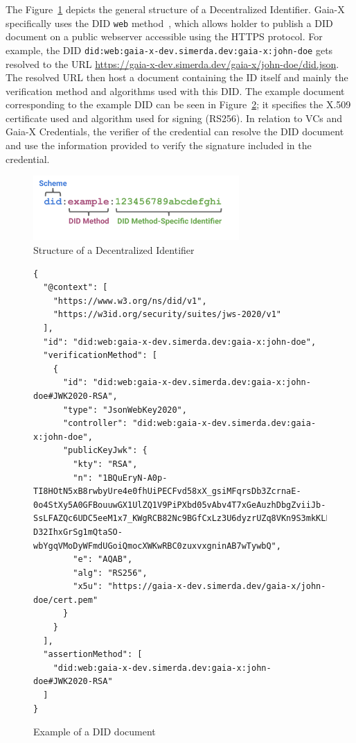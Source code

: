The Figure~\ref{fig:did_structure} depicts the general structure of a Decentralized Identifier.
Gaia-X specifically uses the DID \texttt{web} method~\cite{didweb}, which allows holder to publish a DID document on a public webserver accessible using the HTTPS protocol.
For example, the DID \texttt{did:web:gaia-x-dev.simerda.dev:gaia-x:john-doe} gets resolved to the URL \url{https://gaia-x-dev.simerda.dev/gaia-x/john-doe/did.json}.
The resolved URL then host a document containing the ID itself and mainly the verification method and algorithms used with this DID.
The example document corresponding to the example DID can be seen in Figure~\ref{fig:did_document}; it specifies the X.509 certificate used and algorithm used for signing (RS256).
In relation to VCs and Gaia-X Credentials, the verifier of the credential can resolve the DID document and use the information provided to verify the signature included in the credential.

\begin{figure}
    \centering
    \includegraphics[width=0.7\textwidth]{figures/parts-of-a-did.png}
    \caption{Structure of a Decentralized Identifier~\cite{did}}\label{fig:did_structure}
\end{figure}

\begin{figure}
\centering
\begin{verbatim}
{
  "@context": [
    "https://www.w3.org/ns/did/v1",
    "https://w3id.org/security/suites/jws-2020/v1"
  ],
  "id": "did:web:gaia-x-dev.simerda.dev:gaia-x:john-doe",
  "verificationMethod": [
    {
      "id": "did:web:gaia-x-dev.simerda.dev:gaia-x:john-doe#JWK2020-RSA",
      "type": "JsonWebKey2020",
      "controller": "did:web:gaia-x-dev.simerda.dev:gaia-x:john-doe",
      "publicKeyJwk": {
        "kty": "RSA",
        "n": "1BQuEryN-A0p-TI8HOtN5xB8rwbyUre4e0fhUiPECFvd58xX_gsiMFqrsDb3ZcrnaE-0o4StXy5A0GFBouuwGX1UlZQ1V9PiPXbd05vAbv4T7xGeAuzhDbgZviiJb-SsLFAZQc6UDC5eeM1x7_KWgRCB82Nc9BGfCxLz3U6dyzrUZq8VKn9S3mkKLLuslewa00X8TCHEAVQFEktVV9F617GXEknrEZhKoZfPeuiweMj4FxuamBRQPaZlCWQduiDnVkmNu4pr7C7HJQkBxxH-D32IhxGrSg1mQtaSO-wbYgqVMoDyWFmdUGoiQmocXWKwRBC0zuxvxgninAB7wTywbQ",
        "e": "AQAB",
        "alg": "RS256",
        "x5u": "https://gaia-x-dev.simerda.dev/gaia-x/john-doe/cert.pem"
      }
    }
  ],
  "assertionMethod": [
    "did:web:gaia-x-dev.simerda.dev:gaia-x:john-doe#JWK2020-RSA"
  ]
}
\end{verbatim}
\caption{Example of a DID document}\label{fig:did_document}
\end{figure}

